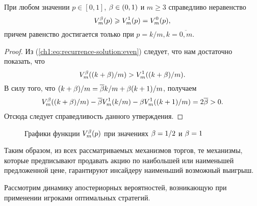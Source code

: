 {\begin{proposition}
  \label{ch1:prop:value-comparison}
  При любом значении $p \in [0,1]$, $\beta \in (0,1)$ и $m \geq 3$ справедливо неравенство
  \begin{equation*}
    V^{\beta}_m(p) \geqslant V^1_m(p) = V^0_m(p),
  \end{equation*}
  причем равенство достигается только при $p = k/m, k = \overline{0,m}$.
\end{proposition}
\begin{proof}
  Из (\ref{ch1:eq:recurrence-solution:even}) следует, что нам достаточно показать, что 
  \[
    V^\beta_m((k+\beta)/m) > V^1_m((k+\beta)/m).
  \]
  В силу того, что $(k+\beta)/m = {\overline{\beta}} k/m + \beta (k+1)/m$, получаем
  \begin{gather*}
    V^{\beta}_m((k+\beta)/m) - {\overline{\beta}} V^1_m(k/m) - \beta V^1_m((k+1)/m) = 2{\overline{\beta}} > 0.
  \end{gather*}
  Отсюда следует справедливость данного утверждения.
\end{proof}

\begin{figure}[b]
  \centering
  \caption{Графики функции $V^{\beta}_m(p)$ при значениях $\beta = 1/2$ и $\beta = 1$}
  \label{ch1:fig:value-comparison}
\end{figure}

Таким образом, из всех рассматриваемых механизмов торгов, те механизмы, которые предписывают продавать акцию по наибольшей или наименьшей предложенной цене, гарантируют инсайдеру наименьший возможный выигрыш.

Рассмотрим динамику апостериорных вероятностей, возникающую при применении игроками оптимальных стратегий.

}
